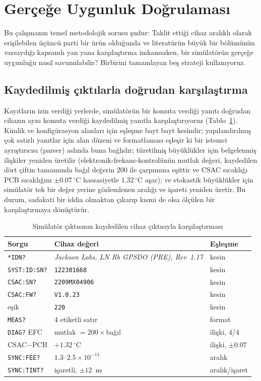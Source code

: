 \documentclass[conference]{IEEEtran}
\begin{document}
\section{Gerçeğe Uygunluk Doğrulaması}
\label{sec:validation}
Bu çalışmanın temel metodolojik sorusu şudur: Taklit ettiği cihaz aralıklı olarak erişilebilen üçüncü parti bir ürün olduğunda ve literatürün büyük bir bölümünün varsaydığı kapsamlı yan yana karşılaştırma imkansızken, bir simülatörün gerçeğe uygunluğu nasıl savunulabilir? Birbirini tamamlayan beş strateji kullanıyoruz.

\subsection{Kaydedilmiş çıktılarla doğrudan karşılaştırma}
Kayıtların izin verdiği yerlerde, simülatörün bir komuta verdiği yanıtı doğrudan cihazın aynı komuta verdiği kaydedilmiş yanıtla karşılaştırıyoruz (Tablo~\ref{tab:fidelity}). Kimlik ve konfigürasyon alanları için eşleşme bayt bayt kesindir; yapılandırılmış çok satırlı yanıtlar için alan düzeni ve formatlaması eşleşir ki bir istemci ayrıştırıcısı (parser) aslında buna bağlıdır; türetilmiş büyüklükler için belgelenmiş ilişkiler yeniden üretilir (elektronik-frekans-kontrolünün mutlak değeri, kaydedilen dört çiftin tamamında bağıl değerin $200$ ile çarpımına eşittir ve CSAC sıcaklığı PCB sıcaklığını $\pm0.07\,^\circ$C hassasiyetle $1.32\,^\circ$C aşar); ve stokastik büyüklükler için simülatör tek bir değer yerine gözlemlenen aralığı ve işareti yeniden üretir. Bu durum, sadakati bir iddia olmaktan çıkarıp kısmi de olsa ölçülen bir karşılaştırmaya dönüştürür.

\begin{table}[t]
\caption{Simülatör çıktısının kaydedilen cihaz çıktısıyla karşılaştırması}
\label{tab:fidelity}
\centering
\footnotesize
\renewcommand{\arraystretch}{1.2}
\begin{tabular}{@{}p{}p{}p{}@{}}
\toprule
\textbf{Sorgu} & \textbf{Cihaz değeri} & \textbf{Eşleşme} \\
\midrule
\texttt{*IDN?} & \emph{Jackson Labs, LN Rb GPSDO (PRE), Rev~1.17} & kesin \\
\texttt{SYST:ID:SN?} & \texttt{122301668} & kesin \\
\texttt{CSAC:SN?} & \texttt{2209MX04906} & kesin \\
\texttt{CSAC:FW?} & \texttt{V1.0.23} & kesin \\
eşik & \texttt{220} & kesin \\
\texttt{MEAS?} & 4 etiketli satır & format \\
\texttt{DIAG?} EFC & mutlak $=200\times$bağıl & ilişki, 4/4 \\
CSAC$-$PCB & $+1.32\,^\circ$C & ilişki, $\pm0.07$ \\
\texttt{SYNC:FEE?} & $1.3$--$2.5\times10^{-11}$ & aralık \\
\texttt{SYNC:TINT?} & işaretli, $\pm12$~ns & aralık/işaret \\
\bottomrule
\end{tabular}
\end{table}
\end{document}
